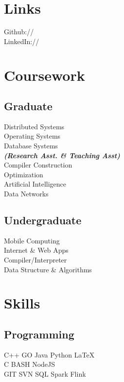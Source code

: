 \documentclass[]{deedy-resume-openfont}
\begin{document}
\begin{minipage}[t]{0.33\textwidth}
\section{Links} 
Github:// \href{https://github.com/sh-ankur/}{} \\
LinkedIn://  \href{https://www.linkedin.com/in/ankursh92}{} \\
\sectionsep


\section{Coursework}
\subsection{Graduate}
Distributed Systems \\
Operating Systems \\
Database Systems\\
{\footnotesize \textit{\textbf{(Research Asst. \& Teaching Asst) }}} \\
Compiler Construction \\
Optimization \\
Artificial Intelligence \\
Data Networks \\
\sectionsep

\subsection{Undergraduate}
Mobile Computing \\
Internet \& Web Apps \\
Compiler/Interpreter\\
Data Structure \& Algorithms\\
\sectionsep


\section{Skills}
\subsection{Programming}
C++ \textbullet{}   GO \textbullet{} Java \textbullet{} Python \textbullet{} \LaTeX\ \\ 
C \textbullet{} BASH \textbullet{} NodeJS \\
GIT \textbullet{} SVN \textbullet{} SQL \textbullet{} Spark  \textbullet{} Flink
\sectionsep

%
%

\end{minipage} 
\end{document}
